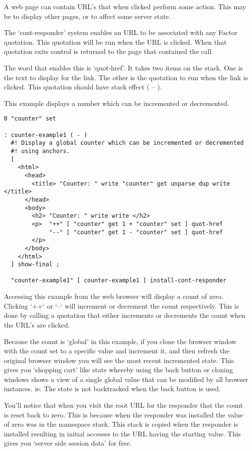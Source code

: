A web page can contain URL's that when clicked perform some
action. This may be to display other pages, or to affect some server
state. 

The `cont-responder' system enables an URL to be associated with any
Factor quotation. This quotation will be run when the URL is
clicked. When that quotation exits control is returned to the page
that contained the call. 

The word that enables this is `quot-href'. It takes two items on the
stack. One is the text to display for the link. The other is the
quotation to run when the link is clicked. This quotation should have
stack effect ( -- ).

This example displays a number which can be incremented or
decremented. 

\begin{verbatim}
0 "counter" set

: counter-example1 ( - )
  #! Display a global counter which can be incremented or decremented
  #! using anchors.
  [
    <html>
      <head> 
        <title> "Counter: " write "counter" get unparse dup write  </title>
      </head>
      <body>
        <h2> "Counter: " write write </h2> 
        <p>  "++" [ "counter" get 1 + "counter" set ] quot-href
             "--" [ "counter" get 1 - "counter" set ] quot-href
        </p>
      </body>
    </html>
  ] show-final ;

  "counter-example1" [ counter-example1 ] install-cont-responder
\end{verbatim}

Accessing this example from the web browser will display a count of
zero. Clicking `++` or `--` will increment or decrement the count
respectively. This is done by calling a quotation that either
increments or decrements the count when the URL's are clicked. 

Because the count is `global' in this example, if you clone the
browser window with the count set to a specific value and increment
it, and then refresh the original browser window you will see the most
recent incremented state. This gives you `shopping cart' like state
whereby using the back button or cloning windows shows a view of a
single global value that can be modified by all browser
instances. ie. The state is not backtracked when the back button is
used.

You'll notice that when you visit the root URL for the responder that
the count is reset back to zero. This is because when the responder
was installed the value of zero was in the namespace stack. This stack
is copied when the responder is installed resulting in initial
accesses to the URL having the starting value. This gives you `server
side session data' for free.

